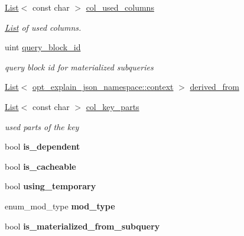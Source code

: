 \begin{DoxyCompactItemize}
\mbox{\hyperlink{classList}{List}}$<$ const char $>$ \mbox{\hyperlink{classqep__row_a74083e1ff0f37e1710848d57340c0520}{col\+\_\+used\+\_\+columns}}
\begin{DoxyCompactList}\small\item\em \mbox{\hyperlink{classList}{List}} of used columns. \end{DoxyCompactList}\item 
\mbox{\label{classqep__row_abdf07d3b7c467add68f6e691f518e260}} 
uint \mbox{\hyperlink{classqep__row_abdf07d3b7c467add68f6e691f518e260}{query\+\_\+block\+\_\+id}}
\begin{DoxyCompactList}\small\item\em query block id for materialized subqueries \end{DoxyCompactList}\item 
\mbox{\hyperlink{classList}{List}}$<$ \mbox{\hyperlink{classopt__explain__json__namespace_1_1context}{opt\+\_\+explain\+\_\+json\+\_\+namespace\+::context}} $>$ \mbox{\hyperlink{classqep__row_ab8d7ac6bb3668a34937ba6b7c459deb7}{derived\+\_\+from}}
\item 
\mbox{\label{classqep__row_a694ac95f7b5c5d91340bc71c5dd278dd}} 
\mbox{\hyperlink{classList}{List}}$<$ const char $>$ \mbox{\hyperlink{classqep__row_a694ac95f7b5c5d91340bc71c5dd278dd}{col\+\_\+key\+\_\+parts}}
\begin{DoxyCompactList}\small\item\em used parts of the key \end{DoxyCompactList}\item 
\mbox{\label{classqep__row_ab6b1686a061ce0c7fb7de341fbb9ea41}} 
bool {\bfseries is\+\_\+dependent}
\item 
\mbox{\label{classqep__row_ac7ec72c971e16feb5c8f6a975f7dfd34}} 
bool {\bfseries is\+\_\+cacheable}
\item 
\mbox{\label{classqep__row_a940ba8f3249561376eab1d1e3a60e092}} 
bool {\bfseries using\+\_\+temporary}
\item 
\mbox{\label{classqep__row_a331d413f68cc367e0300e75d45ffa513}} 
enum\+\_\+mod\+\_\+type {\bfseries mod\+\_\+type}
\item 
\mbox{\label{classqep__row_af90914fea3874dd21c23761143f5be64}} 
bool {\bfseries is\+\_\+materialized\+\_\+from\+\_\+subquery}
\end{DoxyCompactItemize}
